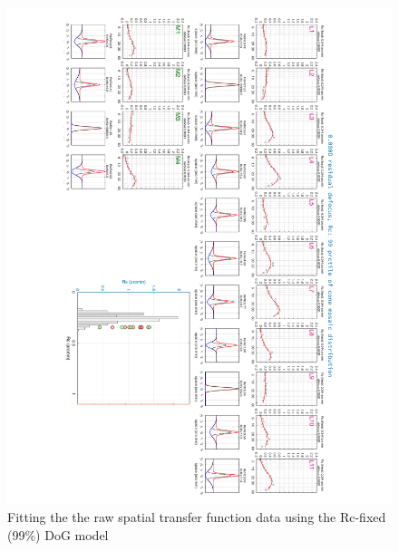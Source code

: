 \documentclass[11pt, oneside]{article}   	%
\begin{document}
\begin{figure}[htbp] %
   \centering
   \includegraphics[width=7in]{Slide3.pdf} 
   \caption{Fitting the the raw spatial transfer function data using the Rc-fixed (99\%) DoG model}
   \label{fig:example}
\end{figure}
\end{document}

